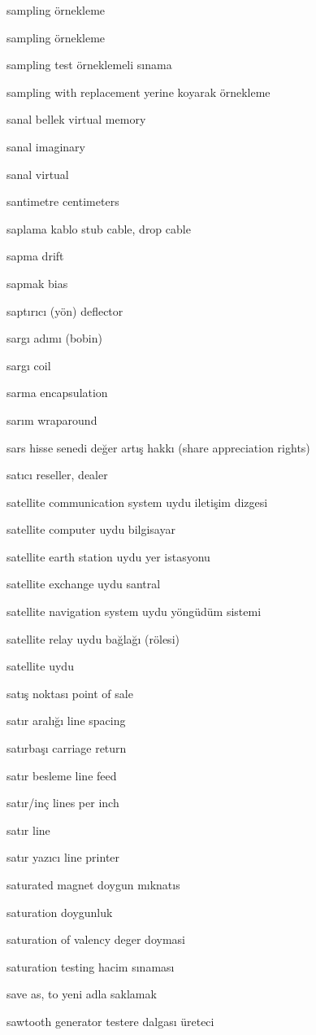 \documentclass[12pt,fleqn]{article}\usepackage{../../common}
\begin{document}
sampling örnekleme

sampling örnekleme

sampling test örneklemeli sınama

sampling with replacement yerine koyarak örnekleme

sanal bellek virtual memory

sanal imaginary

sanal virtual

santimetre centimeters

saplama kablo stub cable, drop cable

sapma drift

sapmak bias

saptırıcı (yön) deflector

sargı adımı (bobin)

sargı coil

sarma encapsulation

sarım wraparound

sars hisse senedi değer artış hakkı (share appreciation rights)

satıcı reseller, dealer

satellite communication system uydu iletişim dizgesi

satellite computer uydu bilgisayar

satellite earth station uydu yer istasyonu

satellite exchange uydu santral

satellite navigation system uydu yöngüdüm sistemi

satellite relay uydu bağlağı (rölesi)

satellite uydu

satış noktası point of sale

satır aralığı line spacing

satırbaşı carriage return

satır besleme line feed

satır/inç lines per inch

satır line

satır yazıcı line printer

saturated magnet doygun mıknatıs

saturation doygunluk

saturation of valency deger doymasi

saturation testing hacim sınaması

save as, to yeni adla saklamak

sawtooth generator testere dalgası üreteci
\end{document}

